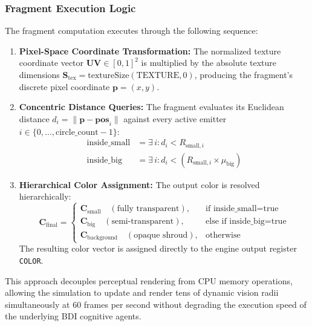 \subsubsection{Fragment Execution Logic}
The fragment computation executes through the following sequence:
\begin{enumerate}
    \item \textbf{Pixel-Space Coordinate Transformation:} The normalized texture coordinate vector $\mathbf{UV} \in [0, 1]^2$ is multiplied by the absolute texture dimensions $\mathbf{S}_{\text{tex}} = \text{textureSize}(\text{TEXTURE}, 0)$, producing the fragment's discrete pixel coordinate $\mathbf{p} = (x, y)$.
    \item \textbf{Concentric Distance Queries:} The fragment evaluates its Euclidean distance $d_i = \|\mathbf{p} - \mathbf{pos}_i\|$ against every active emitter $i \in \{0, \dots, \text{circle\_count}-1\}$:
    \begin{align}
        \text{inside\_small} &= \exists \, i : d_i < R_{\text{small}, i} \\
        \text{inside\_big} &= \exists \, i : d_i < (R_{\text{small}, i} \times \mu_{\text{big}})
    \end{align}
    \item \textbf{Hierarchical Color Assignment:} The output color is resolved hierarchically:
    \begin{equation}
        \mathbf{C}_{\text{final}} = \begin{cases}
            \mathbf{C}_{\text{small}} \quad (\text{fully transparent}), & \text{if } \text{inside\_small} = \text{true} \\
            \mathbf{C}_{\text{big}} \quad (\text{semi-transparent}), & \text{else if } \text{inside\_big} = \text{true} \\
            \mathbf{C}_{\text{background}} \quad (\text{opaque shroud}), & \text{otherwise}
        \end{cases}
    \end{equation}
    The resulting color vector is assigned directly to the engine output register \texttt{COLOR}.
\end{enumerate}

This approach decouples perceptual rendering from CPU memory operations, allowing the simulation to update and render tens of dynamic vision radii simultaneously at 60 frames per second without degrading the execution speed of the underlying BDI cognitive agents.

